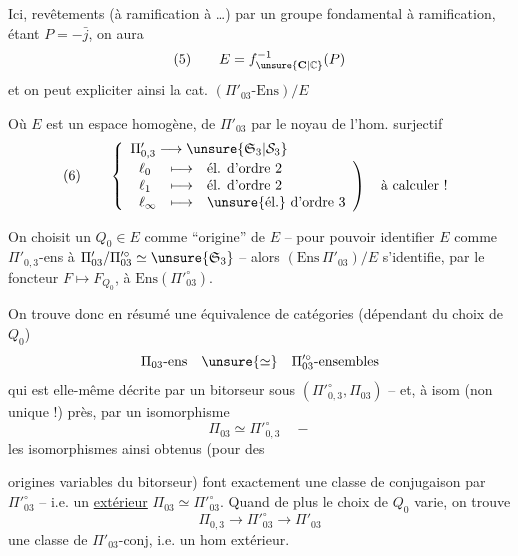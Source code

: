 Ici,   revêtements  (à ramification  à \dots) par un groupe fondamental à ramification, étant  $P=-\bar j$, on aura
\[
(5)\qquad E=f_{\unsure{\mathbf C|\mathbb C}}^{-1}(P)
\]
et on peut expliciter ainsi la cat. $(\Pi'_{03}\text{-Ens})/E$\unsure{;}

Où $E$ est un espace homogène,   de $\Pi'_{03}$ par le   noyau de l'hom. surjectif 
\[
(6)\qquad
\left\{
\begin{array}{l}
\Pi'_{0,3}\longrightarrow\unsure{\mathfrak S_3|\mathcal S_3}\\[2pt]
\left.
\begin{array}{lll}
\ell_0 &\longmapsto& \text{él. d'ordre 2}\\
\ell_1 &\longmapsto& \text{él. d'ordre 2}\\
\ell_\infty &\longmapsto& \text{\unsure{él.} d'ordre 3}
\end{array}
\right)\quad\text{à calculer !}
\end{array}
\right.
\]

On choisit un $Q_0\in E$ comme ``origine'' de $E$ -- pour pouvoir identifier $E$ comme $\Pi'_{0,3}$-ens à $\Pi'_{03}/\Pi'^{\circ}_{03}\simeq\unsure{\mathfrak S_3}$ -- alors $(\mathrm{Ens}\,\Pi'_{03})/E$ s'identifie, par le foncteur $F\longmapsto F_{Q_0}$, à $\mathrm{Ens}(\Pi'^{\circ}_{03})$.

On trouve donc en résumé une équivalence de catégories (dépendant du choix de $Q_0$)
\[
\Pi_{03}\text{-ens}\quad\unsure{\simeq}\quad\Pi'^{\circ}_{03}\text{-ensembles}
\]
qui est elle-même décrite par un bitorseur sous $(\Pi'^{\circ}_{0,3},\Pi_{03})$ -- et, à isom  (non unique !) près, par un isomorphisme
\[
\Pi_{03}\simeq\Pi'^{\circ}_{0,3}\quad -
\]
les isomorphismes ainsi obtenus (pour des


origines variables du bitorseur) font exactement une classe de conjugaison par $\Pi'^{\circ}_{03}$ -- i.e. un \uline{} \uline{extérieur} $\Pi_{03}\simeq\Pi'^{\circ}_{03}$. Quand de plus le choix de $Q_0$ varie, on trouve  
\[
\Pi_{0,3}\longrightarrow\Pi'^{\circ}_{03}\longrightarrow\Pi'_{03}
\]
 une classe de $\Pi'_{03}$-conj, i.e. un hom extérieur.

